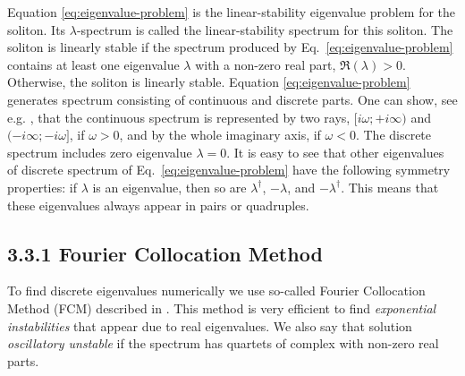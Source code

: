 Equation \eqref{eq:eigenvalue-problem} is the linear-stability eigenvalue problem for the soliton.
Its $\lambda$-spectrum is called the linear-stability spectrum for this soliton.
The soliton is linearly stable if the spectrum produced by Eq.~\eqref{eq:eigenvalue-problem} contains at least one eigenvalue $\lambda$ with a non-zero real part, $\mathfrak{R}(\lambda) > 0$.
Otherwise, the soliton is linearly stable.
Equation \eqref{eq:eigenvalue-problem} generates spectrum consisting of continuous and discrete parts.
One can show, see e.g. \cite{JiankeYang}, that the continuous spectrum is represented by two rays, $[i\omega; +i \infty)$ and $(-i \infty; -i \omega]$, if $\omega > 0$, and by the whole imaginary axis, if $\omega < 0$.
The discrete spectrum includes zero eigenvalue $\lambda = 0$.
It is easy to see that other eigenvalues of discrete spectrum of Eq.~\eqref{eq:eigenvalue-problem} have the following symmetry properties: if $\lambda$ is an eigenvalue, then so are $\lambda^{\dagger}$, $-\lambda$, and $-\lambda^{\dagger}$.
This means that these eigenvalues always appear in pairs or quadruples.

\subsection*{3.3.1 Fourier Collocation Method}

To find discrete eigenvalues numerically we use so-called Fourier Collocation Method (FCM) described in \cite{JiankeYang}.
This method is very efficient to find {\it exponential instabilities} that appear due to real eigenvalues.
We also say that solution {\it oscillatory unstable} if the spectrum has quartets of complex with non-zero real parts.

